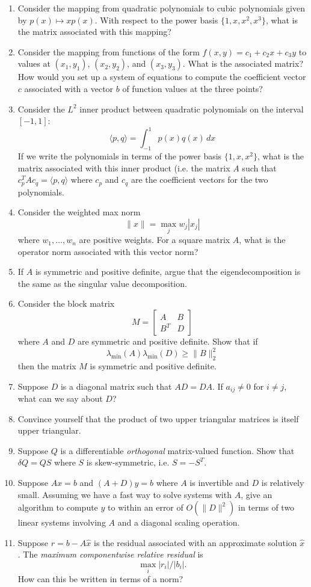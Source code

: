 \documentclass[12pt, leqno]{article}
\begin{document}
\begin{enumerate}
\item
  Consider the mapping from quadratic polynomials to cubic polynomials
  given by $p(x) \mapsto x p(x)$.  With respect to the power basis
  $\{1, x, x^2, x^3\}$, what is the matrix associated with this
  mapping?
\item
  Consider the mapping from functions of the form
  $f(x,y) = c_1 + c_2 x + c_3 y$
  to values at $(x_1,y_1)$, $(x_2,y_2)$, and $(x_3,y_3)$.
  What is the associated matrix?  How would you set up a system
  of equations to compute the coefficient vector $c$ associated
  with a vector $b$ of function values at the three points?
\item
  Consider the $L^2$ inner product between quadratic polynomials
  on the interval $[-1,1]$:
  \[
    \langle p, q \rangle = \int_{-1}^1 p(x) q(x) \, dx
  \]
  If we write the polynomials in terms of the power basis
  $\{1, x, x^2\}$, what is the matrix associated with this inner
  product (i.e. the matrix $A$ such that $c_p^T A c_q = \langle p, q
  \rangle$ where $c_p$ and $c_q$ are the coefficient vectors for
  the two polynomials.
\item
  Consider the weighted max norm
  \[
    \|x\| = \max_{j} w_j |x_j|
  \]
  where $w_1, \ldots, w_n$ are positive weights.  For a square matrix
  $A$, what is the operator norm associated with this vector norm?
\item
  If $A$ is symmetric and positive definite, argue that the
  eigendecomposition is the same as the singular value decomposition.
\item
  Consider the block matrix
  \[
    M = \begin{bmatrix} A & B \\ B^T & D \end{bmatrix}
  \]
  where $A$ and $D$ are symmetric and positive definite.  Show that if
  \[
    \lambda_{\min}(A) \lambda_{\min}(D) \geq \|B\|_2^2
  \]
  then the matrix $M$ is symmetric and positive definite.
\item
  Suppose $D$ is a diagonal matrix such that $AD = DA$.  If
  $a_{ij} \neq 0$ for $i \neq j$, what can we say about $D$?
\item
  Convince yourself that the product of two upper triangular
  matrices is itself upper triangular.
\item
  Suppose $Q$ is a differentiable {\em orthogonal} matrix-valued
  function.  Show that $\delta Q = Q S$ where $S$ is skew-symmetric,
  i.e. $S = -S^T$.
\item
  Suppose $Ax = b$ and $(A+D) y = b$ where $A$ is invertible and $D$
  is relatively small.  Assuming we have a fast way to solve systems
  with $A$, give an algorithm to compute $y$ to within an error of
  $O(\|D\|^2)$ in terms of two linear systems involving $A$ and a
  diagonal scaling operation.
\item
  Suppose $r = b-A\hat{x}$ is the residual associated with an
  approximate solution $\hat{x}$.  The {\em maximum componentwise
    relative residual} is
  \[
    \max_i |r_i|/|b_i|.
  \]
  How can this be written in terms of a norm?
\end{enumerate}
\end{document}
